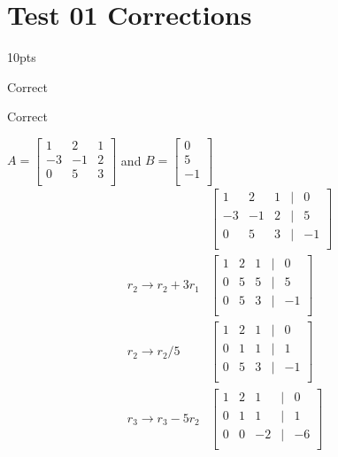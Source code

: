 \chapter{Test 01 Corrections}

\begin{prob} 10pts
\begin{subprob}
Correct
\end{subprob}
\begin{subprob}
Correct
\end{subprob}
\end{prob}
\begin{prob}
$A=
\begin{bmatrix}
   1 & 2 & 1\\
   -3 & -1 & 2\\
   0 & 5 & 3\\
\end{bmatrix}$ and $B=\begin{bmatrix}
   0 \\
   5 \\
   -1 \\
\end{bmatrix}$\\
\begin{align*}
&\begin{bmatrix}
   1 & 2 & 1 & | & 0\\
   -3 & -1 & 2 & | & 5\\
   0 & 5 & 3 & | & -1\\
\end{bmatrix}\\
r_2\rightarrow r_2+3r_1&\begin{bmatrix}
   1 & 2 & 1 & | & 0\\
   0 & 5 & 5 & | & 5\\
   0 & 5 & 3 & | & -1\\
\end{bmatrix}\\
r_2\rightarrow r_2/5&\begin{bmatrix}
   1 & 2 & 1 & | & 0\\
   0 & 1 & 1 & | & 1\\
   0 & 5 & 3 & | & -1\\
\end{bmatrix}\\
r_3\rightarrow r_3-5r_2&\begin{bmatrix}
   1 & 2 & 1 & | & 0\\
   0 & 1 & 1 & | & 1\\
   0 & 0 & -2 & | & -6\\

\end{bmatrix}
\end{align*}
\end{prob}
